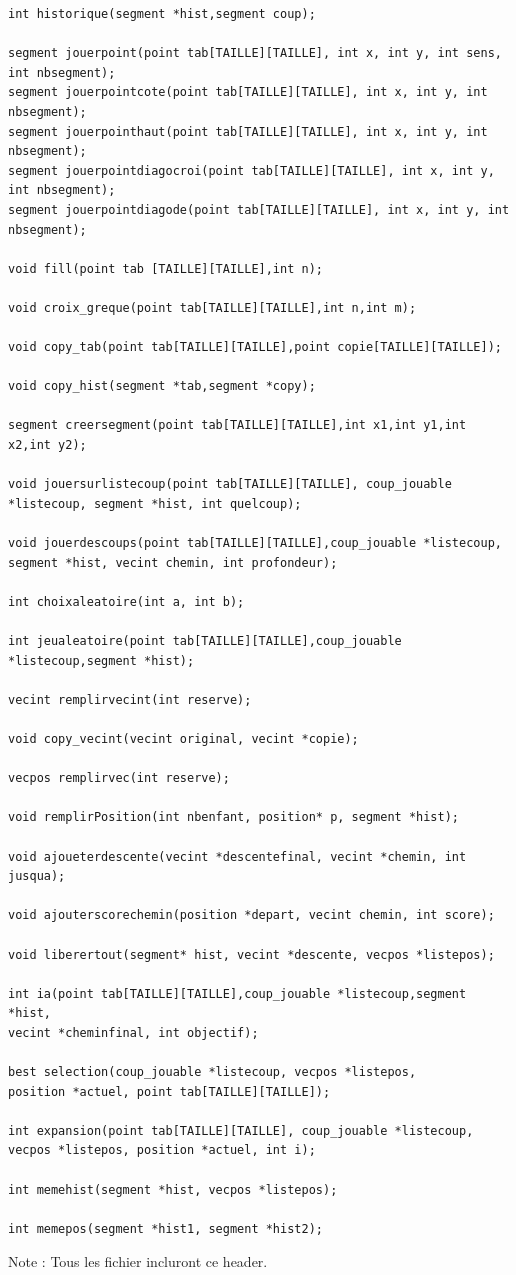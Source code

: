 \documentclass[11pt]{article}
\begin{document}
\begin{verbatim}
int historique(segment *hist,segment coup);

segment jouerpoint(point tab[TAILLE][TAILLE], int x, int y, int sens, int nbsegment);
segment jouerpointcote(point tab[TAILLE][TAILLE], int x, int y, int nbsegment);
segment jouerpointhaut(point tab[TAILLE][TAILLE], int x, int y, int nbsegment);
segment jouerpointdiagocroi(point tab[TAILLE][TAILLE], int x, int y, int nbsegment);
segment jouerpointdiagode(point tab[TAILLE][TAILLE], int x, int y, int nbsegment);

void fill(point tab [TAILLE][TAILLE],int n);

void croix_greque(point tab[TAILLE][TAILLE],int n,int m);

void copy_tab(point tab[TAILLE][TAILLE],point copie[TAILLE][TAILLE]);

void copy_hist(segment *tab,segment *copy);

segment creersegment(point tab[TAILLE][TAILLE],int x1,int y1,int x2,int y2);

void jouersurlistecoup(point tab[TAILLE][TAILLE], coup_jouable
*listecoup, segment *hist, int quelcoup);

void jouerdescoups(point tab[TAILLE][TAILLE],coup_jouable *listecoup,
segment *hist, vecint chemin, int profondeur);

int choixaleatoire(int a, int b);

int jeualeatoire(point tab[TAILLE][TAILLE],coup_jouable *listecoup,segment *hist);

vecint remplirvecint(int reserve);

void copy_vecint(vecint original, vecint *copie);

vecpos remplirvec(int reserve);

void remplirPosition(int nbenfant, position* p, segment *hist);

void ajoueterdescente(vecint *descentefinal, vecint *chemin, int jusqua);

void ajouterscorechemin(position *depart, vecint chemin, int score);

void liberertout(segment* hist, vecint *descente, vecpos *listepos);

int ia(point tab[TAILLE][TAILLE],coup_jouable *listecoup,segment *hist,
vecint *cheminfinal, int objectif);

best selection(coup_jouable *listecoup, vecpos *listepos,
position *actuel, point tab[TAILLE][TAILLE]);

int expansion(point tab[TAILLE][TAILLE], coup_jouable *listecoup,
vecpos *listepos, position *actuel, int i);

int memehist(segment *hist, vecpos *listepos);

int memepos(segment *hist1, segment *hist2);

\end{verbatim}
Note : Tous les fichier incluront ce header.\\
\end{document}
